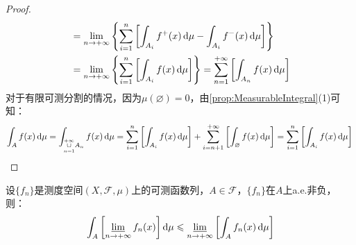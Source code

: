 \begin{proof}
\begin{align*}
		&=\lim_{n\to+\infty}\left\{\sum_{i=1}^{n}\left[\int_{A_i}f^+(x)\mathop{}\!\mathrm{d}\mu-\int_{A_i}f^-(x)\mathop{}\!\mathrm{d}\mu\right]\right\} \\
		&=\lim_{n\to+\infty}\left\{\sum_{i=1}^{n}\left[\int_{A_i}f(x)\mathop{}\!\mathrm{d}\mu\right]\right\}=\sum_{n=1}^{+\infty}\left[\int_{A_n}f(x)\mathop{}\!\mathrm{d}\mu\right]
	\end{align*}
	对于有限可测分割的情况，因为$\mu(\varnothing)=0$，由\cref{prop:MeasurableIntegral}(1)可知：
	\begin{equation*}
		\int_{A}f(x)\mathop{}\!\mathrm{d}\mu=\int_{\underset{n=1}{\overset{+\infty}{\cup}}A_n}f(x)\mathop{}\!\mathrm{d}\mu=\sum_{i=1}^{n}\left[\int_{A_i}f(x)\mathop{}\!\mathrm{d}\mu\right]+\sum_{i=n+1}^{+\infty}\left[\int_{\varnothing}f(x)\mathop{}\!\mathrm{d}\mu\right]=\sum_{i=1}^{n}\left[\int_{A_i}f(x)\mathop{}\!\mathrm{d}\mu\right]\qedhere
	\end{equation*}
\end{proof}
\begin{theorem}\label{theo:FatouLemma}
	设$\{f_n\}$是测度空间$(X,\mathscr{F},\mu)$上的可测函数列，$A\in\mathscr{F}$，$\{f_n\}$在$A$上a.e.非负，则：
	\begin{equation*}
		\int_{A}\left[\varliminf_{n\to+\infty}f_n(x)\right]\mathop{}\!\mathrm{d}\mu\leqslant\varliminf_{n\to+\infty}\left[\int_{A}f_n(x)\mathop{}\!\mathrm{d}\mu\right]
	\end{equation*}
\end{theorem}
